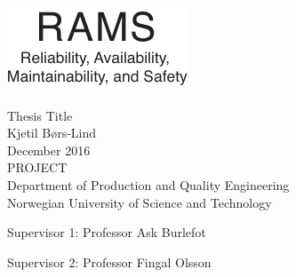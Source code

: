 
\thispagestyle{empty}
\includegraphics[scale=1.1]{fig/rams}
\mbox{}\\[6pc]
\begin{center}
\Huge{Thesis Title}\\[2pc]

\Large{Kjetil Børs-Lind}\\[1pc]
\large{December 2016}\\[2pc]

PROJECT\\
Department of Production and Quality Engineering\\
Norwegian University of Science and Technology
\end{center}
\vfill

\noindent Supervisor 1: Professor Ask Burlefot

\noindent Supervisor 2: Professor Fingal Olsson

